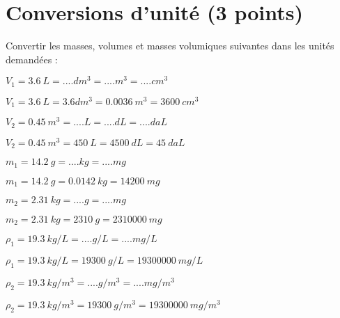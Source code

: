 \section{Conversions d'unité (3 points)}\label{ex:convert}

Convertir les masses, volumes et masses volumiques suivantes dans les unités demandées :
\begin{questions}
	
			
		\question[\half] $V_1 = \num{3.6}\  L = .... dm^3 = .... m^3 = ....cm^3 $
		\begin{solution}
			$V_1 = \num{3.6}\  L = \num{3.6} dm^3 = \num{0.0036}\  m^3 = \num{3600}\  cm^3 $
		\end{solution}
		
		\question[\half] $V_2 = \num{0.45}\  m^3 = .... L = .... dL = .... daL $
		\begin{solution}
			$V_2 = \num{0.45}\  m^3 = \num{450}\  L = \num{4500}\  dL = \num{45}\  daL $
		\end{solution}
		
		
		\question[\half] $m_1 = \num{14.2}\  g = .... kg = .... mg $
		\begin{solution}
			$m_1 = \num{14.2}\  g = \num{0.0142}\  kg = \num{14200}\  mg $
		\end{solution}
		
		\question[\half] $m_2 = \num{2.31}\  kg = .... g = .... mg $
		\begin{solution}
			$m_2 = \num{2.31}\  kg = \num{2310}\  g = \num{2310000}\  mg $
		\end{solution}
		
		\question[\half] $\rho _1 = \num{19.3}\  kg/L = .... g/L = .... mg/L $
		\begin{solution}
			$\rho _1 = \num{19.3}\  kg/L = \num{19300}\  g/L = \num{19300000}\  mg/L $
		\end{solution}
		
		\question[\half] $\rho _2 = \num{19.3}\  kg/m^3 = .... g/m^3 = .... mg/m^3 $
		\begin{solution}
			$\rho _2
			 = \num{19.3}\  kg/m^3 = \num{19300} \  g/m^3 = \num{19300000} \  mg/m^3 $
		\end{solution}
	
\end{questions}
